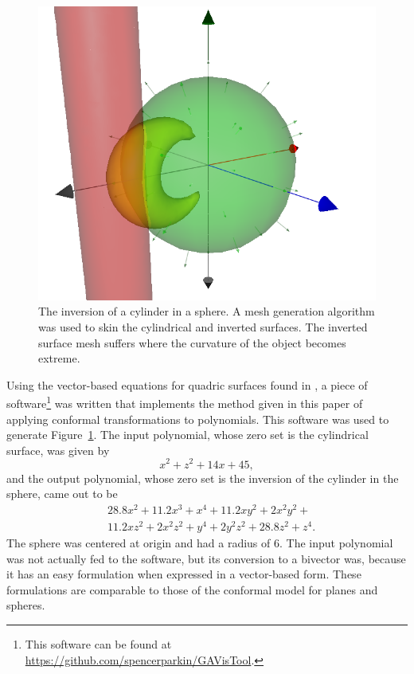 \documentclass{birkjour}
\theoremstyle{definition}
\theoremstyle{remark}
\numberwithin{equation}{section}
\begin{document}
\begin{figure}
\includegraphics[scale=0.3]{InvertCylinderInSphere}
\caption{The inversion of a cylinder in a sphere.  A mesh generation algorithm was used to skin
the cylindrical and inverted surfaces.  The inverted surface mesh suffers where the curvature
of the object becomes extreme.}
\label{fig_invert_cylinder_in_sphere}
\end{figure}

Using the vector-based equations for quadric surfaces found in \cite{Miller87},
a piece of software\footnote{This software can be found at \url{https://github.com/spencerparkin/GAVisTool}.}
was written that implements the method given in this paper of
applying conformal transformations to polynomials.  This software was used
to generate Figure~\ref{fig_invert_cylinder_in_sphere}.  The input
polynomial, whose zero set is the cylindrical surface, was given by
\begin{equation*}
x^2 + z^2 + 14x + 45,
\end{equation*}
and the output polynomial, whose zero set is the inversion of the cylinder in the sphere,
came out to be
\begin{equation*}
\begin{split}
&28.8x^{2} + 11.2x^{3} + x^{4} + 11.2xy^{2} + 2x^{2}y^{2} + \\
&11.2xz^{2} + 2x^{2}z^{2} + y^{4} + 2y^{2}z^{2} + 28.8z^{2} + z^{4}.
\end{split}
\end{equation*}
The sphere was centered at origin and had a radius of 6.  The input polynomial
was not actually fed to the software, but its conversion to a bivector was, because
it has an easy formulation when expressed in a vector-based form.  These formulations
are comparable to those of the conformal model for planes and spheres.
\end{document}
